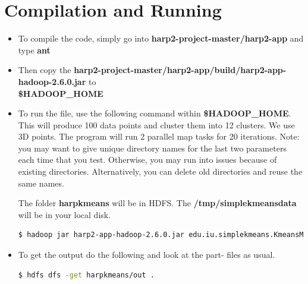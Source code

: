 \documentclass{article}
\begin{document}
\section*{Compilation and Running}
\begin{itemize}
\item To compile the code, simply go into \textbf{harp2-project-master/harp2-app} and type \textbf{ant}
\item Then copy the \textbf{harp2-project-master/harp2-app/build/harp2-app-hadoop-2.6.0.jar} to \\
\textbf{\$HADOOP\_HOME}
\item To run the file, use the following command within \textbf{\$HADOOP\_HOME}. This will produce 100 data points and cluster them into 12 clusters. We use 3D points. The program will run 2 parallel map tasks for 20 iterations. Note: you may want to give unique directory names for the last two parameters each time that you test. Otherwise, you may run into issues because of existing directories. Alternatively, you can delete old directories and reuse the same names. 

The folder \textbf{harpkmeans} will be in HDFS. The \textbf{/tmp/simplekmeansdata} will be in your local disk.
\begin{lstlisting}[language=bash]
$ hadoop jar harp2-app-hadoop-2.6.0.jar edu.iu.simplekmeans.KmeansMapCollective 100 12 3 2 20 harpkmeans /tmp/simplekmeansdata
\end{lstlisting}
\item To get the output do the following and look at the part- files as usual.
\begin{lstlisting}[language=bash]
$ hdfs dfs -get harpkmeans/out .
\end{lstlisting}
\end{itemize}

 
\end{document}

